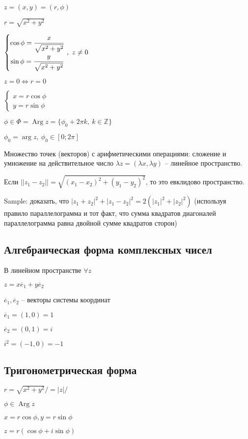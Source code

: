 \documentclass[draft]{article}
\newcommand{\Z}{\mathbb{Z}}
\newcommand{\LRA}{\Leftrightarrow}
\renewcommand{\bar}{\overline}
\newcommand{\Arg}{\mathop{\mathrm{Arg}}\nolimits}
\theoremstyle{remark}
\begin{document}
$z=(x,y)=(r,\phi)$

$r=\sqrt{x^2+y^2}$

$\left\{\begin{matrix}
\cos\phi=\cfrac{x}{\sqrt{x^2+y^2}} \\
\sin\phi=\cfrac{y}{\sqrt{x^2+y^2}}
\end{matrix}\right.\,,\ z\neq0$

$z=0\LRA r=0$

$\left\{\begin{matrix}
x=r\cos\phi\\
y=r\sin\phi
\end{matrix}\right.$

$\phi\in\Phi=\Arg z=\{\phi_0+2\pi k,\ k\in\Z\}$

$\phi_0=\arg z,\ \phi_0\in[0;2\pi]$

Множество точек (векторов) с арифметическими операциями: сложение и умножение на действительное число $\lambda z=(\lambda x, \lambda y)$ -- линейное пространство.

Если $||z_1-z_2||=\sqrt{(x_1-x_2)^2+(y_1-y_2)^2}$, то это евклидово пространство.

Sample: доказать, что $|z_1+z_2|^2+|z_1-z_2|^2=2(|z_1|^2+|z_2|^2)$ (используя правило параллелограмма и тот факт, что сумма квадратов диагоналей параллелограмма равна двойной сумме квадратов сторон)

\subsection{Алгебраическая форма комплексных чисел}

В линейном пространстве $\forall z$

$z=x\bar{e}_1+y\bar{e}_2$

$\bar{e}_1,\bar{e}_2$ -- векторы системы координат

$\bar{e}_1=(1,0)=1$

$\bar{e}_2=(0,1)=i$

$i^2=(-1,0)=-1$

\subsection{Тригонометрическая форма}

$r=\sqrt{x^2+y^2}/=|z|/$

$\phi\in \Arg z$

$x=r\cos\phi, y=r\sin\phi$

$z=r(\cos\phi+i\sin\phi)$
\end{document}
